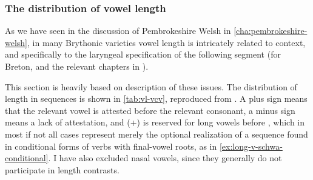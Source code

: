 \subsubsection{The distribution of vowel length}
\label{sec:distr-vowel-length}

As we have seen in the discussion of Pembrokeshire Welsh in \cref{cha:pembrokeshire-welsh}, in many Brythonic varieties vowel length is intricately related to context, and specifically to the laryngeal specification of the following segment (for Breton, \cf \citealt{falchun,le78:_le_ploug,ploneis,sinou99:_le_lechiag} and the relevant chapters in \citealt{ternes11}).

This section is heavily based on  description of these issues. The distribution of length in  sequences is shown in \cref{tab:vl-vcv}, reproduced from \citet[p.~92]{humphreys95:_phonol_bothoa_saint_nicol_pelem}. A plus sign means that the relevant vowel is attested before the relevant consonant, a minus sign means a lack of attestation, and (+) is reserved for long vowels before \ipa{[f]}, which in most if not all cases represent merely the optional realization of a  sequence found in conditional forms of verbs with final-vowel roots, as in \cref{ex:long-v-schwa-conditional}. I have also excluded nasal vowels, since they generally do not participate in length contrasts.

